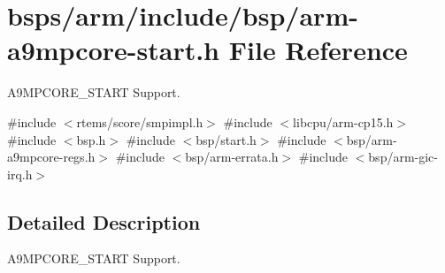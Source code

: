 \hypertarget{arm-a9mpcore-start_8h}{}\section{bsps/arm/include/bsp/arm-\/a9mpcore-\/start.h File Reference}
\label{arm-a9mpcore-start_8h}


A9\+M\+P\+C\+O\+R\+E\+\_\+\+S\+T\+A\+RT Support.  


{\ttfamily \#include $<$rtems/score/smpimpl.\+h$>$}\newline
{\ttfamily \#include $<$libcpu/arm-\/cp15.\+h$>$}\newline
{\ttfamily \#include $<$bsp.\+h$>$}\newline
{\ttfamily \#include $<$bsp/start.\+h$>$}\newline
{\ttfamily \#include $<$bsp/arm-\/a9mpcore-\/regs.\+h$>$}\newline
{\ttfamily \#include $<$bsp/arm-\/errata.\+h$>$}\newline
{\ttfamily \#include $<$bsp/arm-\/gic-\/irq.\+h$>$}\newline


\subsection{Detailed Description}
A9\+M\+P\+C\+O\+R\+E\+\_\+\+S\+T\+A\+RT Support. 

